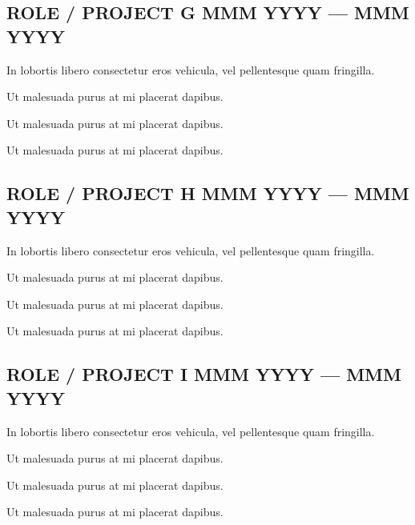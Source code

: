 \subsection{{ROLE / PROJECT G \hfill MMM YYYY --- MMM YYYY}}
\begin{zitemize}
    \item In lobortis libero consectetur eros vehicula, vel pellentesque quam fringilla.
    \item Ut malesuada purus at mi placerat dapibus.
    \item Ut malesuada purus at mi placerat dapibus.
    \item Ut malesuada purus at mi placerat dapibus.
\end{zitemize}

\subsection{{ROLE / PROJECT H \hfill MMM YYYY --- MMM YYYY}}
\begin{zitemize}
    \item In lobortis libero consectetur eros vehicula, vel pellentesque quam fringilla.
    \item Ut malesuada purus at mi placerat dapibus.
    \item Ut malesuada purus at mi placerat dapibus.
    \item Ut malesuada purus at mi placerat dapibus.
\end{zitemize}

\subsection{{ROLE / PROJECT I \hfill MMM YYYY --- MMM YYYY}}
\begin{zitemize}
    \item In lobortis libero consectetur eros vehicula, vel pellentesque quam fringilla.
    \item Ut malesuada purus at mi placerat dapibus.
    \item Ut malesuada purus at mi placerat dapibus.
    \item Ut malesuada purus at mi placerat dapibus.
\end{zitemize}